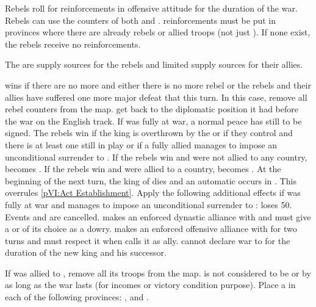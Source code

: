 \phadm
\aparag Rebels roll for reinforcements in offensive attitude for the duration
of the war.
\bparag Rebels can use the counters of both \paysecosse and \paysroyalistes.
\bparag reinforcements must be put in provinces where there are already rebels
or allied troops (not just \REVOLT ). If none exist, the rebels receive no
reinforcements.

\phmil
\aparag The \REVOLT are supply sources for the rebels and limited supply
sources for their allies.

\phpaix
\aparag \ANG wins if there are no more \REVOLT and either there is no more
rebel \ARMY or the rebels and their allies have suffered one more major defeat
that \ANG this turn.
\bparag In this case, remove all rebel counters from the map.
\bparag \paysecosse get back to the diplomatic position it had before the war
on the English track.
\bparag If \FRA was fully at war, a normal peace has still to be signed.
\aparag The rebels win if the king is overthrown by the \REVOLT or if they
control \villeLondon and there is at least one \REVOLT still in play or if a
fully allied \FRA manages to impose an unconditional surrender to \ANG.
\bparag If the rebels win and were not allied to any \CATHCR country, \ANG
becomes \CATHCO.
\bparag If the rebels win and were allied to a \CATHCR country, \ANG becomes
\CATHCR.
\bparag At the beginning of the next turn, the king of \ANG dies and an
automatic  occurs in \ANG. This overrules \ref{pVI:Act
  Establishment}.
\aparag Apply the following additional effects if \FRA was fully at war and
manages to impose an unconditional surrender to \ANG:
\bparag \ANG loses 50\VP.
\bparag Events  and  are
cancelled.
\bparag \ANG makes an enforced dynastic alliance with \FRA and must give a
\COL or \TP of its choice as a dowry.
\bparag \ANG makes an enforced offensive alliance with \FRA for two turns and
must respect it when \FRA calls it as ally.
\bparag \ANG cannot declare war to \FRA for the duration of the new king and
his successor.



\phevnt
\aparag If \paysecosse was allied to \ANG, remove all its troops from the map.
\bparag \paysecosse is not considered to be \VASSAL or \ANNEXION by \ANG as
long as the war lasts (for incomes or victory condition purpose).
\aparag Place a \REVOLT \facemoins in each of the following provinces:
\provinceHighlands, \provinceMoray and \provinceAlba.


